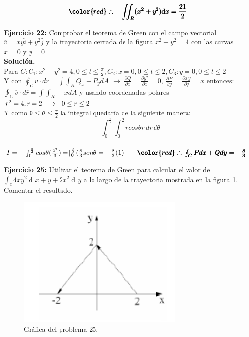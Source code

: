 \documentclass[12pt]{article}
\DeclareMathOperator{\di}{d\!}
\begin{document}
\begin{gather*}
	\pmb{\color{red} \therefore \quad \iint_R (x^2 + y^2) \mathrm{d}x = \frac{21}{2}}
\end{gather*}

\textbf{Ejercicio 22:} Comprobar el teorema de Green con el campo vectorial $\overline{v}=xy\hat{i}+y^2\hat{j}$ y la trayectoria cerrada de la figura $x^2+y^2=4$ con las curvas $x=0$ y $y=0$
\\[10pt]
\textbf{Solución.}
\\[10pt]
Para $C: C_{1}: x^2+y^2=4, 0\leq t \leq \frac{\pi}{2}, C_{2}: x=0, 0\leq t \leq 2, C_{3}: y=0, 0\leq t \leq 2$
\\[7pt]
Y con $\oint_{C}\overline{v}\cdot d\overline{r}=\int\int_{R}Q_{x}-P_{y}dA$ $\rightarrow$ $\frac{\partial Q}{\partial x}=\frac{\partial y^2}{\partial x} = 0, \: \frac{\partial P}{\partial y} = \frac{\partial x\,y}{\partial y} = x $ entonces:
\\[7pt]
$\oint_{C}\overline{v}\cdot d\overline{r}=\int\int_{R}-x dA$ y usando coordenadas polares $r^2=4, r=2 \hspace{0.25cm} \rightarrow \hspace{0.25cm} 0\leq r \leq2$
\\[7pt]
Y como $0\leq \theta \leq\frac{\pi}{2}$ la integral quedaría de la siguiente manera:
\[ -\int_{0}^{\frac{\pi}{2}} \int_{0}^{2} rcos\theta r \,dr\,d\theta \]
\\[7pt]
$I=-\int_{0}^{\frac{\pi}{2}}cos\theta(\frac{2^3}{3})=\rceil_{0}^{\frac{\pi}{2}}(\frac{8}{3}sen\theta=-\frac{8}{3}(1) \qquad \pmb{\color{red} \therefore \: \oint_{C}Pdx+Qdy=-\frac{8}{3}}$

\vspace{5mm}

\noindent \textbf{Ejercicio 25:}  Utilizar el teorema de Green para calcular el valor de
$\int_c 4xy^2 \di x + y+2x^2 \di y$ a lo largo de la trayectoria mostrada en la figura \ref{ej25}. Comentar el resultado.

\begin{figure}[!htbp] 
	\label{ej25}
	\centering
	\includegraphics[scale = 1]{problema25.png}
	\caption{Gráfica del problema 25.}
\end{figure}
\end{document}
